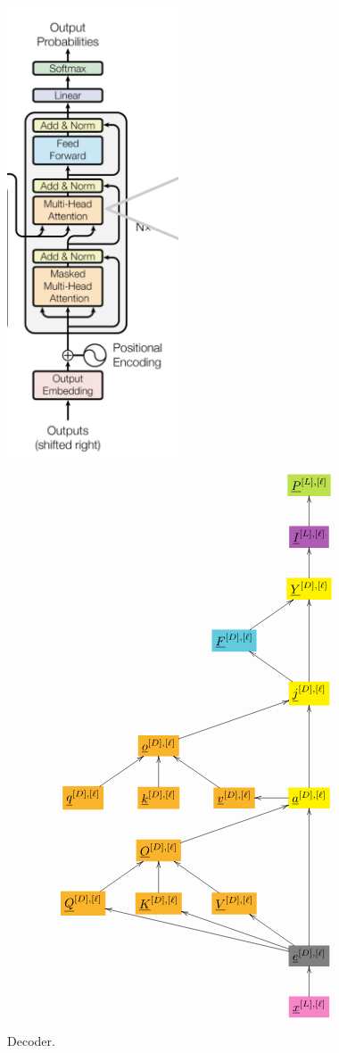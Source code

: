 \documentclass[12pt]{article}
\begin{document}
\begin{figure}[h!]\centering
\begin{minipage}{.5\linewidth}
\includegraphics[width=2in]{decoder.jpg}
\end{minipage}%
\begin{minipage}{.5\linewidth}
$$\xymatrix{
&&&*+[F*:SpringGreen]{\underline{P}^{[L],[\ell]}}
\\
&&&*+[F*:Orchid]{\underline{I}^{[L],[\ell]}}\ar[u]
\\
&&&*+[F*:yellow]{\underline{Y}^{[D], [\ell]}}\ar[u]
\\
&&*+[F*:SkyBlue]{\underline{F}^{[D], [\ell]}}\ar[ur]&
\\
&&&*+[F*:yellow]{\underline{j}^{[D], [\ell]}}\ar[ul]\ar[uu]
\\
&*+[F*:Dandelion]{\underline{o}^{[D],[\ell]}}\ar[urr]&&
\\
*+[F*:Dandelion]{\underline{q}^{[D], [\ell]}}\ar[ur]&*+[F*:Dandelion]{\underline{k}^{[D], [\ell]}}\ar[u]&*+[F*:Dandelion]{\underline{v}^{[D], [\ell]}}\ar[ul]&*+[F*:yellow]{\underline{a}^{[D], [\ell]}}\ar[uu]\ar[l]
\\
&*+[F*:Dandelion]{\underline{O}^{[D],[\ell]}}\ar[urr]&&
\\
*+[F*:Dandelion]{\underline{Q}^{[D], [\ell]}}\ar[ur]&*+[F*:Dandelion]{\underline{K}^{[D], [\ell]}}\ar[u]&*+[F*:Dandelion]{\underline{V}^{[D], [\ell]}}\ar[ul]&
\\
&&&*+[F*:gray]{\underline{e}^{[D],[\ell]}}\ar[ull]\ar[ulll]\ar[ul]\ar[uuu]
\\
&&&*+[F*:Lavender]{\underline{x}^{[L],[\ell]}}\ar[u]
}$$
\end{minipage}
\caption{Decoder.}
\label{fig-texnn-for-decoder}
\end{figure}
\end{document}
